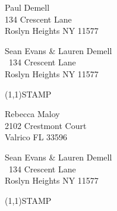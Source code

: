 \documentclass[12pt]{article}
\begin{document}
\begin{center} \begin{Huge} \vspace*{\fill}
Paul Demell\\
134 Crescent Lane\\
Roslyn Heights NY 11577\\
\vspace{\fill} \end{Huge} \end{center}

\clearpage

\begin{minipage}{.5\linewidth} \noindent
Sean Evans \& Lauren Demell\\\ 
134 Crescent Lane\\ 
Roslyn Heights NY 11577
\end{minipage}
\begin{minipage}{.5\linewidth \hspace{-.2in} \vspace{-.3in}}
\begin{flushright}
\framebox(1,1){STAMP}
\end{flushright}
\end{minipage}

\begin{center} \begin{Huge} \vspace*{\fill}
Rebecca Maloy\\
2102 Crestmont Court\\
Valrico FL 33596\\
\vspace{\fill} \end{Huge} \end{center}

\clearpage

\begin{minipage}{.5\linewidth} \noindent
Sean Evans \& Lauren Demell\\\ 
134 Crescent Lane\\ 
Roslyn Heights NY 11577
\end{minipage}
\begin{minipage}{.5\linewidth \hspace{-.2in} \vspace{-.3in}}
\begin{flushright}
\framebox(1,1){STAMP}
\end{flushright}
\end{minipage}
\end{document}
